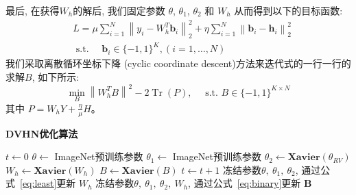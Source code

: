 最后, 在获得$W_h$的解后, 我们固定参数 $\theta$, $\theta_1$, $\theta_2$ 和 $W_h$ 从而得到以下的目标函数: 
\begin{equation}
    \begin{aligned}
&L=\mu \sum_{i=1}^{N}\left\|y_{i}-W_h^{T} \mathbf{b}_{i}\right\|_{2}^{2}+\eta \sum_{i=1}^{N}\left\|\mathbf{b}_{i}-\mathbf{h}_{i}\right\|_{2}^{2} \\
&\text { s.t. } \quad \mathbf{b}_{i} \in\{-1,1\}^{K},(i=1, \ldots, N)
\end{aligned}
\end{equation} 
我们采取离散循环坐标下降 (cyclic coordinate descent)方法来迭代式的一行一行的求解$B$, 如下所示:
\begin{equation}
    \min _{B}\left\|W_h^{T} B\right\|^{2}-2 \operatorname{Tr}(P), \quad \text { s.t. } B \in\{-1,1\}^{K \times N}
    \label{eq:binary}
\end{equation}
其中 $P=W_h Y+\frac{\eta}{\mu} H$。
\begin{algorithm}
    \caption{\textbf{DVHN优化算法}\label{algo:maindvhn}}
    $t \leftarrow 0$\;
    $\theta \leftarrow $ ImageNet预训练参数 \; 
    $\theta_1 \leftarrow $ ImageNet预训练参数 \; 
    $\theta_2 \leftarrow \textbf{Xavier}(\theta_{RV})$  \; 
    $W_h \leftarrow \textbf{Xavier}(W_h)$  \;
    $B \leftarrow \textbf{Xavier}(B)$  \; 
    {
      $t \leftarrow t +1 $\;
      冻结参数$\theta,~\theta_1,~\theta_2$, 通过公式~\ref{eq:least}更新 $W_h$ \;
      冻结参数$\theta,~\theta_1,~\theta_2,~W_h$, 通过公式~\ref{eq:binary}更新 $\mathbf{B}$ \;
    }
    \end{algorithm}
